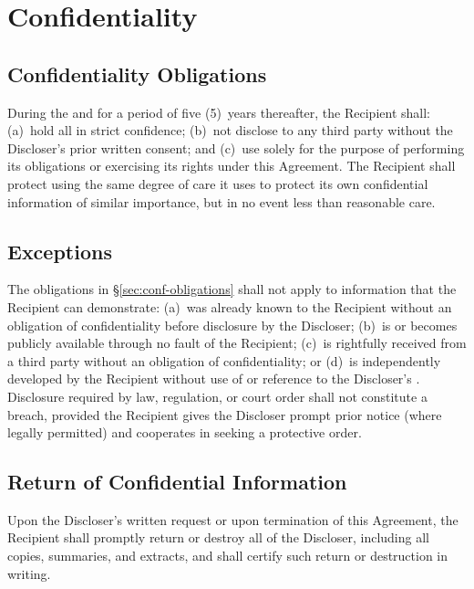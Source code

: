 \section{Confidentiality}

\subsection{Confidentiality Obligations}
During the  and for a period of five (5)~years thereafter, the Recipient shall: (a)~hold all  in strict confidence; (b)~not disclose  to any third party without the Discloser's prior written consent; and (c)~use  solely for the purpose of performing its obligations or exercising its rights under this Agreement. The Recipient shall protect  using the same degree of care it uses to protect its own confidential information of similar importance, but in no event less than reasonable care.

\subsection{Exceptions}
The obligations in \S\ref{sec:conf-obligations} shall not apply to information that the Recipient can demonstrate: (a)~was already known to the Recipient without an obligation of confidentiality before disclosure by the Discloser; (b)~is or becomes publicly available through no fault of the Recipient; (c)~is rightfully received from a third party without an obligation of confidentiality; or (d)~is independently developed by the Recipient without use of or reference to the Discloser's . Disclosure required by law, regulation, or court order shall not constitute a breach, provided the Recipient gives the Discloser prompt prior notice (where legally permitted) and cooperates in seeking a protective order.

\subsection{Return of Confidential Information}
Upon the Discloser's written request or upon termination of this Agreement, the Recipient shall promptly return or destroy all  of the Discloser, including all copies, summaries, and extracts, and shall certify such return or destruction in writing.
\label{sec:conf-obligations}

